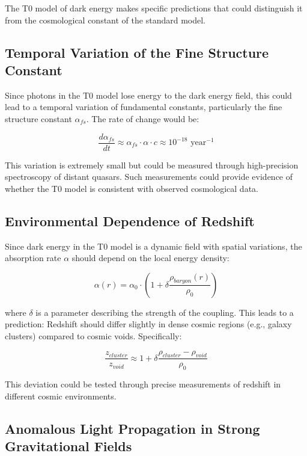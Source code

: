 \documentclass[a4paper,12pt]{article}
\begin{document}
The T0 model of dark energy makes specific predictions that could distinguish it from the cosmological constant of the standard model.

\subsection{Temporal Variation of the Fine Structure Constant}

Since photons in the T0 model lose energy to the dark energy field, this could lead to a temporal variation of fundamental constants, particularly the fine structure constant $\alpha_{fs}$. The rate of change would be:

\begin{equation}
	\frac{d\alpha_{fs}}{dt} \approx \alpha_{fs} \cdot \alpha \cdot c \approx 10^{-18} \text{ year}^{-1}
\end{equation}

This variation is extremely small but could be measured through high-precision spectroscopy of distant quasars. Such measurements could provide evidence of whether the T0 model is consistent with observed cosmological data.

\subsection{Environmental Dependence of Redshift}

Since dark energy in the T0 model is a dynamic field with spatial variations, the absorption rate $\alpha$ should depend on the local energy density:

\begin{equation}
	\alpha(r) = \alpha_0 \cdot \left(1 + \delta\frac{\rho_{baryon}(r)}{\rho_0}\right)
\end{equation}

where $\delta$ is a parameter describing the strength of the coupling. This leads to a prediction: Redshift should differ slightly in dense cosmic regions (e.g., galaxy clusters) compared to cosmic voids. Specifically:

\begin{equation}
	\frac{z_{cluster}}{z_{void}} \approx 1 + \delta\frac{\rho_{cluster} - \rho_{void}}{\rho_0}
\end{equation}

This deviation could be tested through precise measurements of redshift in different cosmic environments.

\subsection{Anomalous Light Propagation in Strong Gravitational Fields}
\end{document}

